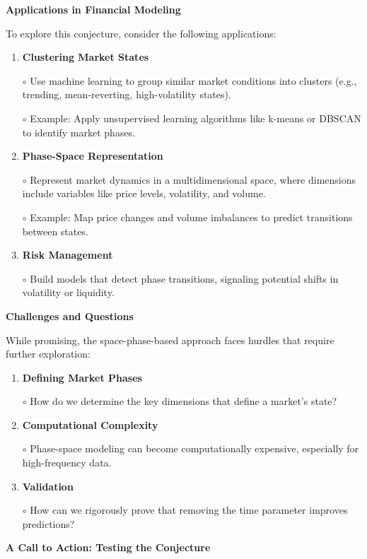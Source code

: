 \documentclass{article}
\newcommand{\bn}{\bigskip\noindent}
\begin{document}
\bn
{\large\bf Applications in Financial Modeling}

To explore this conjecture, consider the following applications:

\begin{enumerate}[1.]
\item   {\bf Clustering Market States}

    $\circ$   Use machine learning to group similar market conditions into clusters (e.g., trending, mean-reverting, high-volatility states).

    $\circ$   Example: Apply unsupervised learning algorithms like k-means or DBSCAN to identify market phases.

\item  {\bf Phase-Space Representation}

    $\circ$   Represent market dynamics in a multidimensional space, where dimensions include variables like price levels, volatility, and volume.

    $\circ$   Example: Map price changes and volume imbalances to predict transitions between states.

\item  {\bf Risk Management}

    $\circ$   Build models that detect phase transitions, signaling potential shifts in volatility or liquidity.
\end{enumerate}


\bn
{\large\bf Challenges and Questions}

While promising, the space-phase-based approach faces hurdles that require further exploration:

\begin{enumerate}[1.]
\item   {\bf Defining Market Phases}

    $\circ$   How do we determine the key dimensions that define a market's state?

\item  {\bf Computational Complexity}

    $\circ$   Phase-space modeling can become computationally expensive, especially for high-frequency data.

\item  {\bf Validation}

    $\circ$   How can we rigorously prove that removing the time parameter improves predictions?
\end{enumerate}


\bn
{\large\bf A Call to Action: Testing the Conjecture}
\end{document}
